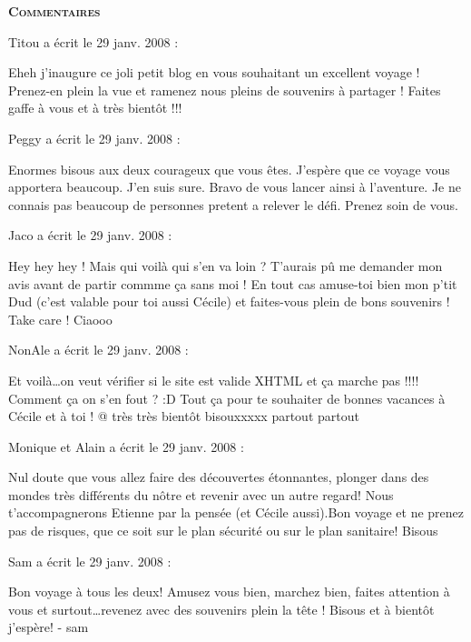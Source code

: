 \bigskip
\textbf{\textsc{Commentaires}}

\medskip
Titou a écrit le 29 janv. 2008 :
\begin{displayquote}
Eheh j'inaugure ce joli petit blog en vous souhaitant un excellent voyage ! Prenez-en plein la vue et ramenez nous pleins de souvenirs à partager ! Faites gaffe à vous et à très bientôt !!!
\end{displayquote}

\medskip
Peggy a écrit le 29 janv. 2008 :
\begin{displayquote}
Enormes bisous aux deux courageux que vous êtes. J'espère que ce voyage vous apportera beaucoup. J'en suis sure. Bravo de vous lancer ainsi à l'aventure. Je ne connais pas beaucoup de personnes pretent a relever le défi. Prenez soin de vous.
\end{displayquote}

\medskip
Jaco a écrit le 29 janv. 2008 :
\begin{displayquote}
Hey hey hey !
Mais qui voilà qui s'en va loin ? T'aurais pû me demander mon avis avant de partir commme ça sans moi !
En tout cas amuse-toi bien mon p'tit Dud (c'est valable pour toi aussi Cécile) et faites-vous plein de bons souvenirs !
Take care !
Ciaooo
\end{displayquote}

\medskip
NonAle a écrit le 29 janv. 2008 :
\begin{displayquote}
Et voilà\dots on veut vérifier si le site est valide XHTML et ça marche pas !!!! Comment ça on s'en fout ? :D
Tout ça pour te souhaiter de bonnes vacances à Cécile et à toi !
@ très très bientôt
bisouxxxxx partout partout
\end{displayquote}

\medskip
Monique et Alain a écrit le 29 janv. 2008 :
\begin{displayquote}
Nul doute que vous allez faire des découvertes étonnantes, plonger dans des mondes très différents du nôtre et revenir avec un autre regard! Nous t'accompagnerons Etienne par la pensée (et Cécile aussi).Bon voyage et ne prenez pas de risques, que ce soit sur le plan sécurité ou sur le plan sanitaire!
Bisous
\end{displayquote}

\medskip
Sam a écrit le 29 janv. 2008 :
\begin{displayquote}
Bon voyage à tous les deux!
Amusez vous bien, marchez bien, faites attention à vous et surtout\dots revenez avec des souvenirs plein la tête !
Bisous et à bientôt j'espère!
- sam
\end{displayquote}

